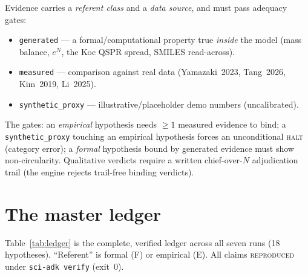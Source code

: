 \documentclass[11pt]{article}
\begin{document}
Evidence carries a \emph{referent class} and a \emph{data source}, and
must pass adequacy gates:
\begin{itemize}
  \item \texttt{generated} --- a formal/computational property true
        \emph{inside} the model (mass balance, $e^{N}$, the Koc QSPR
        spread, SMILES read-across).
  \item \texttt{measured} --- comparison against real data
        (Yamazaki~2023, Tang~2026, Kim~2019, Li~2025).
  \item \texttt{synthetic\_proxy} --- illustrative/placeholder demo
        numbers (uncalibrated).
\end{itemize}
The gates: an \emph{empirical} hypothesis needs $\geq 1$ measured
evidence to bind; a \texttt{synthetic\_proxy} touching an empirical
hypothesis forces an unconditional \textsc{halt} (category error); a
\emph{formal} hypothesis bound by generated evidence must show
non-circularity. Qualitative verdicts require a written
chief-over-$N$ adjudication trail (the engine rejects trail-free
binding verdicts).

\section{The master ledger}
\label{sec:ledger}

Table~\ref{tab:ledger} is the complete, verified ledger across all
seven runs (18 hypotheses). ``Referent'' is formal (F) or empirical
(E). All claims \textsc{reproduced} under \texttt{sci-adk verify}
(exit~0).
\end{document}
